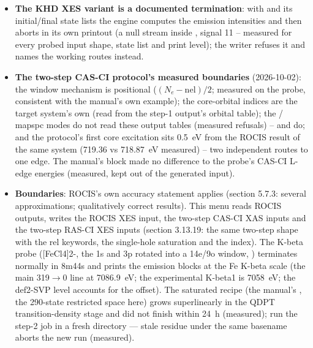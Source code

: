 \begin{readbox}
\begin{itemize}
  \item \textbf{The KHD XES variant is a documented termination}: with
     and its initial/final state lists the engine
    computes the emission intensities and then aborts in its own printout
    (a null stream inside , signal 11 --
    measured for every probed input shape, state list and print level);
    the writer refuses it and names the working routes instead.
  \item \textbf{The two-step CAS-CI protocol's measured boundaries}
    (2026-10-02): the window mechanism is positional
    ($(N_e-\mathrm{nel})/2$; measured on the probe, consistent with the
    manual's own example); the core-orbital indices are the target
    system's own (read from the step-1 output's orbital table); the
    / mapspc modes do not read these output tables
    (measured refusals) --  and  do; and the
    protocol's first core excitation sits 0.5~eV from the ROCIS result of
    the same system (719.36 vs 718.87~eV measured) -- two independent
    routes to one edge.  The manual's  block made no difference to the probe's CAS-CI L-edge
    energies (measured, kept out of the generated input).
  \item \textbf{Boundaries}: ROCIS's own accuracy statement applies
    (section 5.7.3: several approximations; qualitatively correct
    results).  This menu reads ROCIS outputs, writes the ROCIS XES input,
    the two-step CAS-CI XAS inputs and the two-step RAS-CI XES inputs
    (section 3.13.19: the same two-step shape with the  rel
    keywords, the single-hole  saturation and the
     index).  The K-beta probe ([FeCl4]2-, the 1s and 3p
    rotated into a 14e/9o window, ) terminates normally
    in 8m44s and prints the emission blocks at the Fe K-beta scale (the
    main 319$\rightarrow$0 line at 7086.9~eV; the experimental K-beta1 is
    7058~eV; the def2-SVP level accounts for the offset).  The saturated
    recipe (the manual's , the 290-state restricted space
    here) grows superlinearly in the QDPT transition-density stage and did
    not finish within 24~h (measured); run the step-2 job in a fresh
    directory --- stale residue under the same basename aborts the new run
    (measured).
\end{itemize}
\end{readbox}
